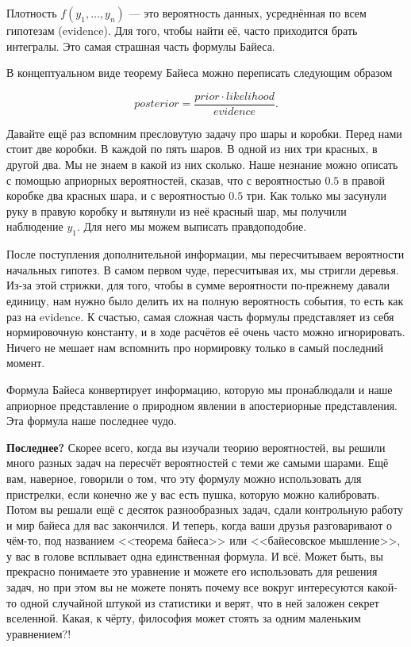 \documentclass[12pt, a4paper, oneside]{extreport}
\theoremstyle{plain}              %
\theoremstyle{definition}         %
\begin{document}
Плотность $f(y_1, \ldots, y_n)$ --- это вероятность данных, усреднённая по всем гипотезам (evidence).  Для того, чтобы найти её, часто приходится брать интегралы. Это самая страшная часть формулы Байеса. 

В концептуальном виде теорему Байеса можно переписать следующим образом

\[ 
posterior = \frac{prior \cdot likelihood}{evidence}.
\]

Давайте ещё раз вспомним пресловутую задачу про шары и коробки.  Перед нами стоит две коробки. В каждой по пять шаров. В одной из них три красных, в другой два. Мы не знаем в какой из них сколько. Наше незнание можно описать с помощью априорных вероятностей, сказав, что с вероятностью $0.5$ в правой коробке два красных шара, и с вероятностью $0.5$ три.  Как только мы засунули руку в правую коробку и вытянули из неё красный шар, мы получили наблюдение $y_1$. Для него мы можем выписать правдоподобие. 

После поступления дополнительной информации, мы пересчитываем вероятности начальных гипотез. В самом первом чуде, пересчитывая их, мы стригли деревья. Из-за этой стрижки, для того, чтобы в сумме вероятности по-прежнему давали единицу, нам нужно было делить их на полную вероятность события, то есть как раз на evidence. К счастью, самая сложная часть формулы представляет из себя нормировочную константу, и в ходе расчётов её очень часто можно игнорировать. Ничего не мешает нам вспомнить про нормировку только в самый последний момент.

Формула Байеса конвертирует информацию, которую мы пронаблюдали и наше априорное представление о природном явлении в апостериорные представления. Эта формула наше последнее чудо.  

\textbf{Последнее?} Скорее всего, когда вы изучали теорию вероятностей, вы решили много разных задач на пересчёт вероятностей с теми же самыми шарами. Ещё вам, наверное, говорили о том, что эту формулу можно использовать для пристрелки,  если конечно же у вас есть пушка, которую можно калибровать. Потом вы решали ещё с десяток разнообразных задач, сдали контрольную работу и мир байеса для вас закончился. И теперь, когда ваши друзья разговаривают о чём-то, под названием <<теорема байеса>> или <<байесовское мышление>>, у вас в голове всплывает одна единственная формула. И всё. Может быть, вы прекрасно понимаете это уравнение и можете его использовать для решения задач, но при этом вы не можете понять почему все вокруг интересуются какой-то одной случайной штукой из статистики и верят, что в ней заложен секрет вселенной. Какая, к чёрту, философия может стоять за одним маленьким уравнением?!
\end{document}
